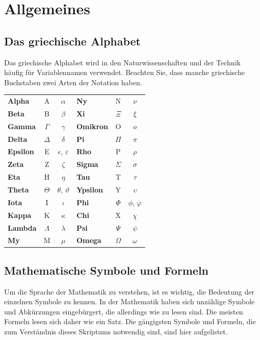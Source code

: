 \chapter*{Allgemeines}\label{chap: Allgemeines}

\section*{Das griechische Alphabet}\label{sec: griechisches_Alphabet}
Das griechische Alphabet wird in den Naturwissenschaften und der Technik häufig für Variablennamen verwendet. Beachten Sie, dass manche griechische Buchstaben zwei Arten der Notation haben. \\
\begin{center}
\def\arraystretch{1.04} %
\begin{tabular}{l c c @{\quad\quad\vrule\quad\quad} l c c} 
\textbf{Alpha} & A & $\alpha$ & \textbf{Ny} & N & $\nu$ \\
\textbf{Beta} & B & $\beta$ & \textbf{Xi} & $\Xi$ & $\xi$ \\
\textbf{Gamma} & $\Gamma$ & $\gamma$ & \textbf{Omikron} & O & $o$ \\
\textbf{Delta} & $\Delta$ & $\delta$ & \textbf{Pi} & $\Pi$ & $\pi$ \\
\textbf{Epsilon} & E & $\epsilon$, $\varepsilon$ & \textbf{Rho} & P & $\rho$ \\
\textbf{Zeta} & Z & $\zeta$ & \textbf{Sigma} & $\Sigma$ & $\sigma$ \\
\textbf{Eta} & H & $\eta$ & \textbf{Tau} & T & $\tau$ \\
\textbf{Theta} & $\Theta$ & $\theta$, $\vartheta$ & \textbf{Ypsilon} & Y & $\upsilon$ \\
\textbf{Iota} & I & $\iota$ & \textbf{Phi} & $\Phi$ & $\phi$, $\varphi$ \\
\textbf{Kappa} & K & $\kappa$ & \textbf{Chi} & X & $\chi$ \\
\textbf{Lambda} & $\Lambda$ & $\lambda$ & \textbf{Psi} & $\Psi$ & $\psi$ \\
\textbf{My} & M & $\mu$ & \textbf{Omega} & $\Omega$ & $\omega$ \\
\end{tabular}
\end{center}
\newpage
\section*{Mathematische Symbole und Formeln}\label{sec: mathematische_Symbole-Formeln}
Um die Sprache der Mathematik zu verstehen, ist es wichtig, die Bedeutung der einzelnen Symbole zu kennen. In der Mathematik haben sich unzählige Symbole und Abkürzungen eingebürgert, die allerdings wie  zu lesen sind. Die meisten Formeln lesen sich daher wie ein Satz. Die gängigsten Symbole und Formeln, die zum Verständnis dieses Skriptums notwendig sind, sind hier aufgelistet.

